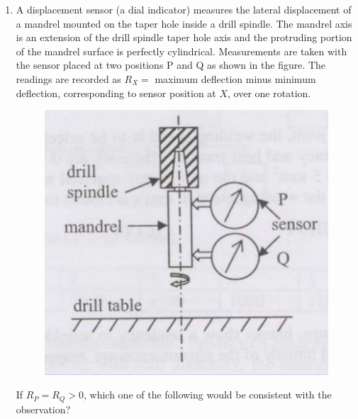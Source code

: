 \documentclass[journal,12pt,onecolumn]{IEEEtran}
\begin{document}
\begin{enumerate}[resume]
    \item A displacement sensor (a dial indicator) measures the lateral displacement of a mandrel mounted on the taper hole inside a drill spindle. The mandrel axis is an extension of the drill spindle taper hole axis and the protruding portion of the mandrel surface is perfectly cylindrical. Measurements are taken with the sensor placed at two positions P and Q as shown in the figure. The readings are recorded as $R_X = $ maximum deflection minus minimum deflection, corresponding to sensor position at $X$, over one rotation.
          \begin{figure}[H]
              \centering
              \includegraphics[scale=0.3]{q70.png}
              \caption{}
              \label{png}
          \end{figure}
          If $R_P=R_Q>0$, which one of the following would be consistent with the observation?

          \begin{enumerate}
          \end{enumerate}
\end{enumerate}
\end{document}

